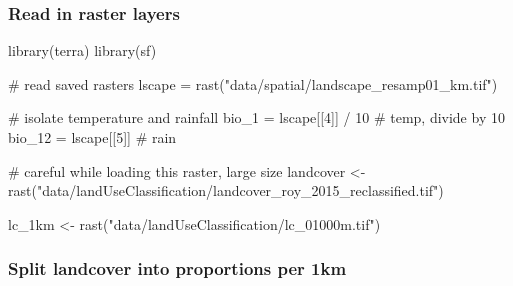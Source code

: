 \documentclass[
]{article}
\newenvironment{Shaded}{}{}
\newcommand{\CommentTok}[1]{\textcolor[rgb]{0.00,0.50,0.00}{#1}}
\newcommand{\DecValTok}[1]{#1}
\newcommand{\KeywordTok}[1]{\textcolor[rgb]{0.00,0.00,1.00}{#1}}
\newcommand{\NormalTok}[1]{#1}
\newcommand{\OperatorTok}[1]{#1}
\newcommand{\StringTok}[1]{\textcolor[rgb]{0.00,0.50,0.50}{#1}}
\begin{document}
\hypertarget{read-in-raster-layers}{%
\subsubsection{Read in raster layers}\label{read-in-raster-layers}}

\begin{Shaded}
\begin{Highlighting}[]
\KeywordTok{library}\NormalTok{(terra)}
\KeywordTok{library}\NormalTok{(sf)}
\end{Highlighting}
\end{Shaded}

\begin{Shaded}
\begin{Highlighting}[]
\CommentTok{# read saved rasters}
\NormalTok{lscape =}\StringTok{ }\KeywordTok{rast}\NormalTok{(}\StringTok{"data/spatial/landscape_resamp01_km.tif"}\NormalTok{)}

\CommentTok{# isolate temperature and rainfall}
\NormalTok{bio_}\DecValTok{1}\NormalTok{ =}\StringTok{ }\NormalTok{lscape[[}\DecValTok{4}\NormalTok{]] }\OperatorTok{/}\StringTok{ }\DecValTok{10} \CommentTok{# temp, divide by 10}
\NormalTok{bio_}\DecValTok{12}\NormalTok{ =}\StringTok{ }\NormalTok{lscape[[}\DecValTok{5}\NormalTok{]] }\CommentTok{# rain}

\CommentTok{# careful while loading this raster, large size}
\NormalTok{landcover <-}\StringTok{ }\KeywordTok{rast}\NormalTok{(}\StringTok{"data/landUseClassification/landcover_roy_2015_reclassified.tif"}\NormalTok{)}

\NormalTok{lc_1km <-}\StringTok{ }\KeywordTok{rast}\NormalTok{(}\StringTok{"data/landUseClassification/lc_01000m.tif"}\NormalTok{)}
\end{Highlighting}
\end{Shaded}

\hypertarget{split-landcover-into-proportions-per-1km}{%
\subsubsection{Split landcover into proportions per 1km}\label{split-landcover-into-proportions-per-1km}}
\end{document}

